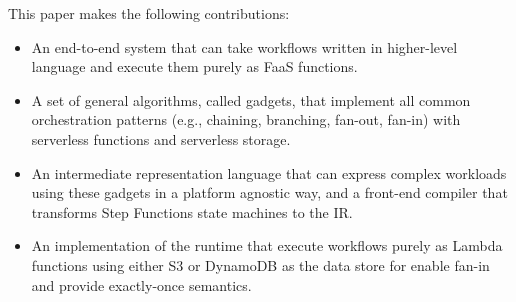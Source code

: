 This paper makes the following contributions:

\begin{itemize}

  \item An end-to-end system that can take workflows written in higher-level
  language and execute them purely as FaaS functions.

  \item A set of general algorithms, called gadgets, that implement all common
  orchestration patterns (e.g., chaining, branching, fan-out, fan-in) with
  serverless functions and serverless storage.

  \item An intermediate representation language that can express complex
  workloads using these gadgets in a platform agnostic way, and a front-end
  compiler that transforms Step Functions state machines to the IR.

  \item An implementation of the \name{} runtime that execute workflows purely
  as Lambda functions using either S3 or DynamoDB as the data store for enable
  fan-in and provide exactly-once semantics.

\end{itemize}

